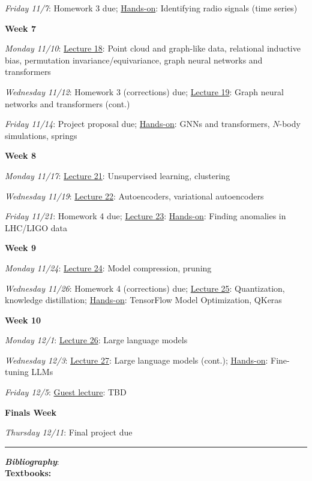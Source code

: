 \documentclass[12pt]{article}
\begin{document}
\emph{Friday 11/7}: Homework 3 due; \underline{Hands-on}: Identifying radio signals (time series)

\noindent\textbf{Week 7}

\emph{Monday 11/10}: \underline{Lecture 18}: Point cloud and graph-like data, relational inductive bias, permutation invariance/equivariance, graph neural networks and transformers

\emph{Wednesday 11/12}: Homework 3 (corrections) due; \underline{Lecture 19}: Graph neural networks and transformers (cont.)

\emph{Friday 11/14}: Project proposal due; \underline{Hands-on}: GNNs and transformers, $N$-body simulations, springs

\noindent\textbf{Week 8}

\emph{Monday 11/17}: \underline{Lecture 21}: Unsupervised learning, clustering

\emph{Wednesday 11/19}: \underline{Lecture 22}: Autoencoders, variational autoencoders

\emph{Friday 11/21}: Homework 4 due; \underline{Lecture 23}: \underline{Hands-on}: Finding anomalies in LHC/LIGO data

\noindent\textbf{Week 9}

\emph{Monday 11/24}: \underline{Lecture 24}: Model compression, pruning

\emph{Wednesday 11/26}: Homework 4 (corrections) due; \underline{Lecture 25}: Quantization, knowledge distillation; \underline{Hands-on}: TensorFlow Model Optimization, QKeras


\noindent\textbf{Week 10}

\emph{Monday 12/1}: \underline{Lecture 26}: Large language models

\emph{Wednesday 12/3}: \underline{Lecture 27}: Large language models (cont.); \underline{Hands-on}: Fine-tuning LLMs

\emph{Friday 12/5}: \underline{Guest lecture}: TBD

\noindent\textbf{Finals Week}

\emph{Thursday 12/11}: Final project due

\begin{center}
	\rule{\textwidth}{0.5pt}
\end{center}

\noindent\textbf{\emph{Bibliography}}:\\

\textbf{Textbooks:}

\newrefsection
\nocite{Mehta:2019,Abu-Mostafa:2012,Erdman:2021,Zeljko:2014,Calafiura:2022,Chollet:2021,Goodfellow-et-al-2016}
\printbibliography[heading=none]
\end{document}
